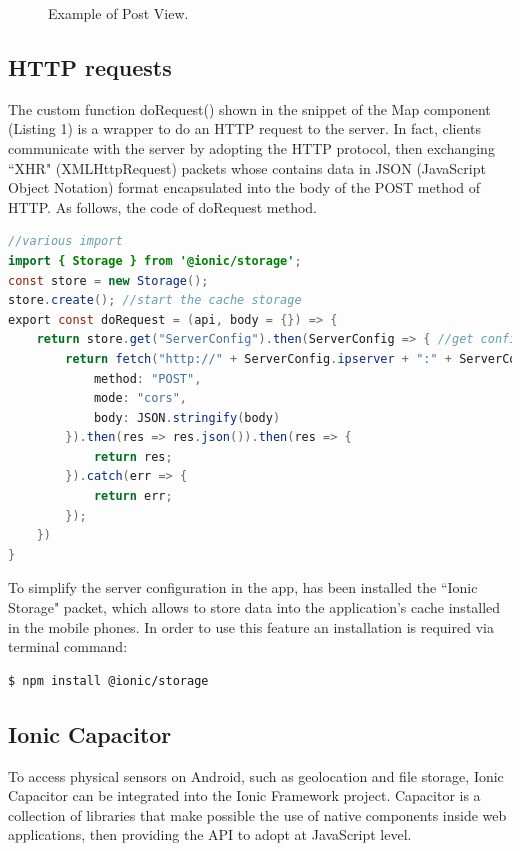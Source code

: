 \documentclass[conference]{IEEEtran}
\begin{document}
\begin{figure}[htbp]
\begin{center}
\end{center}
\caption{Example of Post View.}
\label{fig}
\end{figure}


\subsection{HTTP requests}

The custom function doRequest() shown in the snippet of the Map component (Listing 1) is a wrapper to do an HTTP request to the server.
In fact, clients communicate with the server by adopting the HTTP protocol, then exchanging ``XHR" (XMLHttpRequest) packets whose contains data in JSON (JavaScript Object Notation) format encapsulated into the body of the POST method of HTTP.
As follows, the code of doRequest method.
\begin{lstlisting}[language=Java, caption=Method doRequest to fetch server]
//various import 
import { Storage } from '@ionic/storage';
const store = new Storage(); 
store.create(); //start the cache storage
export const doRequest = (api, body = {}) => {
    return store.get("ServerConfig").then(ServerConfig => { //get config from cache
        return fetch("http://" + ServerConfig.ipserver + ":" + ServerConfig.port + "/" + api, {
            method: "POST",
            mode: "cors",
            body: JSON.stringify(body)
        }).then(res => res.json()).then(res => {
            return res;
        }).catch(err => {
            return err;
        });
    })
}
\end{lstlisting}


To simplify the server configuration in the app, has been installed the ``Ionic Storage" \cite{b9} packet, which allows to store data into the application's cache installed in the mobile phones. In order to use this feature an installation is required via terminal command: 
\begin{lstlisting}[language=Sh]
$ npm install @ionic/storage
\end{lstlisting}



\subsection{Ionic Capacitor}

To access physical sensors on Android, such as geolocation and file storage, Ionic Capacitor\cite{b10} can be integrated into the Ionic Framework project. Capacitor is a collection of libraries that make possible the use of native components inside web applications, then providing the API to adopt at JavaScript level.
\end{document}

